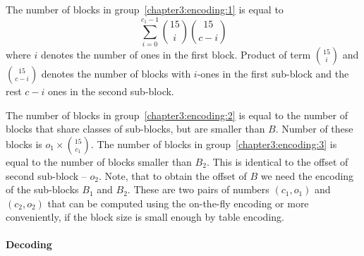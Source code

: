 The number of blocks in group~\ref{chapter3:encoding:1} is equal to
$$\sum_{i=0}^{c_1-1} {15\choose i} {15\choose c-i}$$ where $i$ denotes the number
of ones in the first block. Product of term ${15\choose i}$ and ${15\choose c-i}$
denotes the number of blocks with $i$-ones in the first sub-block and the rest
$c-i$ ones in the second sub-block.

The number of blocks in group~\ref{chapter3:encoding:2} is equal to the number of blocks that
share classes of sub-blocks, but are smaller than $B$. Number of these blocks is $o_1\times {15\choose c_1}$.
The number of blocks in group~\ref{chapter3:encoding:3} is equal to the number of blocks smaller 
than $B_2$. This is identical to the offset of second sub-block -- $o_2$. Note, that to obtain the
offset of $B$ we need the encoding of the sub-blocks $B_1$ and $B_2$. These are two pairs of numbers
$(c_1, o_1)$ and $(c_2, o_2)$ that can be computed using the on-the-fly encoding or more conveniently,
if the block size is small enough by table encoding.

\paragraph{Decoding}

